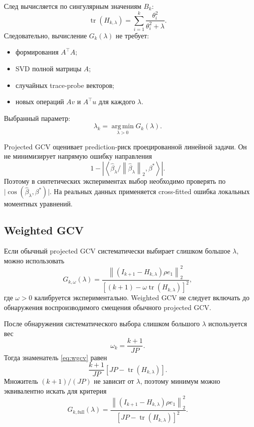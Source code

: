 \documentclass[11pt,a4paper]{article}
\newcommand{\norm}[1]{\left\lVert #1\right\rVert_2}
\newcommand{\ip}[2]{\left\langle #1,#2\right\rangle}
\newcommand{\argmin}{\operatorname*{arg\,min}}
\newcommand{\tr}{\operatorname{tr}}
\begin{document}
След вычисляется по сингулярным значениям \(B_k\):
\begin{equation}
\label{eq:dof}
    \tr(H_{k,\lambda})
    =
    \sum_{i=1}^{k}
    \frac{\theta_i^2}{\theta_i^2+\lambda}.
\end{equation}
Следовательно, вычисление \(G_k(\lambda)\) не требует:

\begin{itemize}[nosep]
    \item формирования \(A^\top A\);
    \item SVD полной матрицы \(A\);
    \item случайных trace-probe векторов;
    \item новых операций \(Av\) и \(A^\top u\) для каждого \(\lambda\).
\end{itemize}

Выбранный параметр:
\begin{equation}
\label{eq:lambda-choice}
    \lambda_k
    =
    \argmin_{\lambda>0}G_k(\lambda).
\end{equation}

Projected GCV оценивает prediction-риск проецированной линейной задачи.
Он не минимизирует напрямую ошибку направления
\[
    1-\left|
        \ip{\widehat\beta_\lambda/\norm{\widehat\beta_\lambda}}{\beta^\ast}
    \right|.
\]
Поэтому в синтетических экспериментах выбор необходимо проверять по
\(\lvert\cos(\widehat\beta_\lambda,\beta^\ast)\rvert\).
На реальных данных применяется cross-fitted ошибка локальных моментных уравнений.

\subsection{Weighted GCV}

Если обычный projected GCV систематически выбирает слишком большое \(\lambda\),
можно использовать
\begin{equation}
\label{eq:wgcv}
    G_{k,\omega}(\lambda)
    =
    \frac{
        \norm{(I_{k+1}-H_{k,\lambda})\rho e_1}^{2}
    }{
        \left[
            (k+1)
            -
            \omega\tr(H_{k,\lambda})
        \right]^2
    },
\end{equation}
где \(\omega>0\) калибруется экспериментально.
Weighted GCV не следует включать до обнаружения воспроизводимого смещения
обычного projected GCV.

После обнаружения систематического выбора слишком большого \(\lambda\)
используется вес
\begin{equation}
\label{eq:wgcv-full-weight}
    \omega_k=\frac{k+1}{JP}.
\end{equation}
Тогда знаменатель \eqref{eq:wgcv} равен
\[
    \frac{k+1}{JP}
    \left[
        JP-\tr(H_{k,\lambda})
    \right].
\]
Множитель \((k+1)/(JP)\) не зависит от \(\lambda\), поэтому минимум можно
эквивалентно искать для критерия
\begin{equation}
\label{eq:wgcv-full}
    G_{k,\mathrm{full}}(\lambda)
    =
    \frac{
        \norm{(I_{k+1}-H_{k,\lambda})\rho e_1}^{2}
    }{
        \left[
            JP-\tr(H_{k,\lambda})
        \right]^2
    }.
\end{equation}
\end{document}
